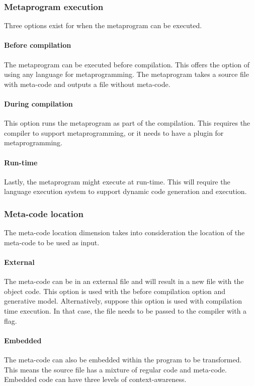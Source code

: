 \subsubsection{Metaprogram execution}
Three options exist for when the metaprogram can be executed.

\paragraph{Before compilation}
The metaprogram can be executed before compilation.
This offers the option of using any language for metaprogramming.
The metaprogram takes a source file with meta-code and outputs a file without meta-code.

\paragraph{During compilation}
This option runs the metaprogram as part of the compilation.
This requires the compiler to support metaprogramming, or it needs to have a plugin for metaprogramming.

\paragraph{Run-time}
Lastly, the metaprogram might execute at run-time.
This will require the language execution system to support dynamic code generation and execution.

\subsubsection{Meta-code location}
The meta-code location dimension takes into consideration the location of the meta-code to be used as input.

\paragraph{External}
The meta-code can be in an external file and will result in a new file with the object code.
This option is used with the before compilation option and generative model.
Alternatively, suppose this option is used with compilation time execution.
In that case, the file needs to be passed to the compiler with a flag.

\paragraph{Embedded}
The meta-code can also be embedded within the program to be transformed.
This means the source file has a mixture of regular code and meta-code.
Embedded code can have three levels of context-awareness.

